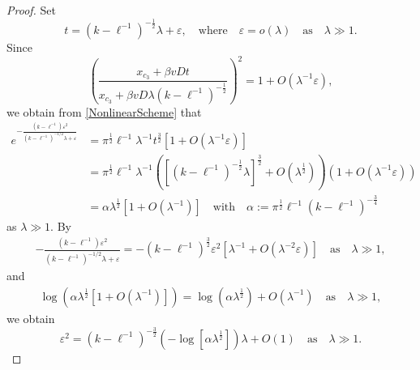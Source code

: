 \documentclass[10pt]{article}
\numberwithin{equation}{section}
\numberwithin{figure}{section}
\begin{document}
\begin{proof}
Set
\begin{equation}\label{peaktimeapp}
t = (k-\ell^{-1})^{-\frac{1}{2}} \lambda + \varepsilon, \quad \mbox{where} \quad \varepsilon = o (\lambda) \quad \mbox{as} \quad \lambda \gg 1.
\end{equation}
Since
$$
\left(\frac{x_{c_3}+\beta vDt }{x_{c_3}+\beta vD \lambda (k-\ell^{-1})^{-\frac{1}{2}}}\right)^2 = 1 + O\left( \lambda^{-1} \varepsilon \right),
$$
we obtain from \eqref{NonlinearScheme} that
\begin{equation*}
\begin{split}
e^{-\frac{(k-\ell^{-1})\varepsilon^2}{(k-\ell^{-1})^{-1/2} \lambda + \varepsilon}} &=
\pi^{\frac{1}{2}} \ell^{-1} \lambda^{-1} t^{\frac{3}{2}} \left[ 1+
O\left( \lambda^{-1} \varepsilon \right) \right] \\
 &=\pi^{\frac{1}{2}} \ell^{-1} \lambda^{-1}   \left( [(k-\ell^{-1})^{-\frac{1}{2}} \lambda ]^{\frac{3}{2}} + O\left( \lambda^\frac{1}{2} \right) \right)  \left( 1+
O\left( \lambda^{-1} \varepsilon \right) \right) \\
&= \alpha \lambda^\frac{1}{2} \left[ 1 + O\left( \lambda^{-1} \right) \right] \quad \mbox{with} \quad 
\alpha:= \pi^{\frac{1}{2}} \ell^{-1} (k-\ell^{-1})^{-\frac{3}{4}}
\end{split}
\end{equation*}
as $\lambda \gg 1$.
By
\begin{equation*}
\begin{split}
-\frac{(k-\ell^{-1})\varepsilon^2}{(k-\ell^{-1})^{-1/2} \lambda + \varepsilon} = -(k-\ell^{-1})^\frac{3}{2} \varepsilon^2 \left[ \lambda^{-1} + O\left( \lambda^{-2}\varepsilon \right) \right] \quad \mbox{as} \quad \lambda \gg 1,
\end{split}
\end{equation*}
and
\begin{equation*}
\begin{split}
\log\left( \alpha \lambda^\frac{1}{2} \left[ 1 + O\left( \lambda^{-1} \right) \right]\right) = \log\left(\alpha \lambda^\frac{1}{2} \right) +  O\left( \lambda^{-1} \right)
\quad \mbox{as} \quad \lambda \gg 1,
\end{split}
\end{equation*}
we obtain 
\begin{equation}
\varepsilon^2 = (k-\ell^{-1})^{-\frac{3}{2}} \left( -\log\left[ \alpha \lambda^\frac{1}{2} \right] \right) \lambda + O\left( 1 \right) \quad \mbox{as} \quad \lambda \gg 1.
\end{equation}

\end{proof}
\end{document}
